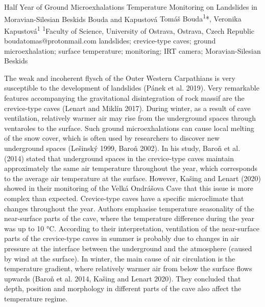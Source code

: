 \abstract
{Half Year of Ground Microexhalations Temperature Monitoring on Landslides in Moravian-Silesian Beskids} 
{Bouda and Kapustová} 
{Tomáš Bouda\textsuperscript{1}*, Veronika Kapustová\textsuperscript{1}} 
{\POtag} 
{
\textsuperscript{1}Faculty of Science, University of Ostrava, Ostrava, Czech Republic
}
{boudatomas@protonmail.com}  %
{landslides; crevice-type caves; ground microexhalation; surface temperature; monitoring; IRT camera; Moravian-Silesian Beskids}
{The weak and incoherent flysch of the Outer Western Carpathians is very susceptible to the development of landslides (Pánek et al. 2019). Very remarkable features accompanying the gravitational disintegration of rock massif are the crevice-type caves (Lenart and Miklín 2017). During winter, as a result of cave ventilation, relatively warmer air may rise from the underground spaces through ventaroles to the surface. Such ground microexhalations can cause local melting of the snow cover, which is often used by researchers to discover new underground spaces (Lešinský 1999, Baroň 2002). In his study, Baroň et al. (2014) stated that underground spaces in the crevice-type caves maintain approximately the same air temperature throughout the year, which corresponds to the average air temperature at the surface. However, Kašing and Lenart (2020) showed in their monitoring of the Velká Ondrášova Cave that this issue is more complex than expected. Crevice-type caves have a specific microclimate that changes throughout the year. Authors emphasise temperature seasonality of the near-surface parts of the cave, where the temperature difference during the year was up to 10 °C. According to their interpretation, ventilation of the near-surface parts of the crevice-type caves in summer is probably due to changes in air pressure at the interface between the underground and the atmosphere (caused by wind at the surface). In winter, the main cause of air circulation is the temperature gradient, where relatively warmer air from below the surface flows upwards (Baroň et al. 2014, Kašing and Lenart 2020). They concluded that depth, position and morphology in different parts of the cave also affect the temperature regime.

}

